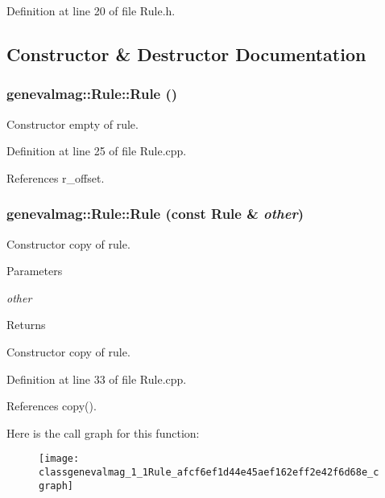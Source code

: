 Definition at line 20 of file Rule.h.



\subsection{Constructor \& Destructor Documentation}
\hypertarget{classgenevalmag_1_1Rule_a1c442e245962ae690729738c7b520c1e}{
\subsubsection[{Rule}]{\setlength{\rightskip}{0pt plus 5cm}genevalmag::Rule::Rule ()}}
\label{classgenevalmag_1_1Rule_a1c442e245962ae690729738c7b520c1e}
Constructor empty of rule. 

Definition at line 25 of file Rule.cpp.



References r\_\-offset.

\hypertarget{classgenevalmag_1_1Rule_afcf6ef1d44e45aef162eff2e42f6d68e}{
\subsubsection[{Rule}]{\setlength{\rightskip}{0pt plus 5cm}genevalmag::Rule::Rule (const {\bf Rule} \& {\em other})}}
\label{classgenevalmag_1_1Rule_afcf6ef1d44e45aef162eff2e42f6d68e}
Constructor copy of rule. 
\begin{DoxyParams}{Parameters}
\item[{\em other}]\end{DoxyParams}
\begin{DoxyReturn}{Returns}

\end{DoxyReturn}
Constructor copy of rule. 

Definition at line 33 of file Rule.cpp.



References copy().



Here is the call graph for this function:\nopagebreak
\begin{figure}[H]
\begin{center}
\leavevmode
\texttt{[image: classgenevalmag\_1\_1Rule\_afcf6ef1d44e45aef162eff2e42f6d68e\_cgraph]}
\end{center}
\end{figure}


